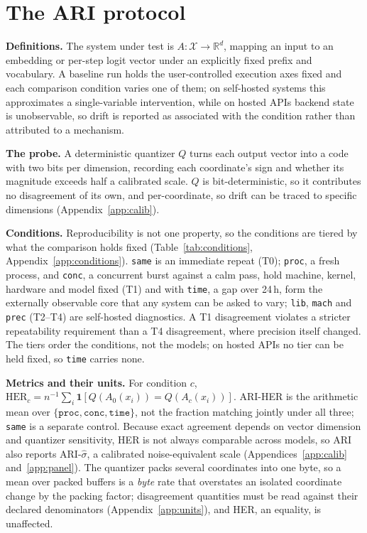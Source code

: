 \documentclass{article}
\begin{document}
\vspace{-4pt}\section{The ARI protocol}\label{sec2}\vspace{-2pt}

\textbf{Definitions.} The system under test is $A:\mathcal{X}\to\mathbb{R}^{d}$, mapping an input to an embedding or per-step logit vector under an explicitly fixed prefix and vocabulary. A baseline run holds the user-controlled execution axes fixed and each comparison condition varies one of them; on self-hosted systems this approximates a single-variable intervention, while on hosted APIs backend state is unobservable, so drift is reported as associated with the condition rather than attributed to a mechanism.

\textbf{The probe.} A deterministic quantizer $Q$ turns each output vector into a code with two bits per dimension, recording each coordinate's sign and whether its magnitude exceeds half a calibrated scale. $Q$ is bit-deterministic, so it contributes no disagreement of its own, and per-coordinate, so drift can be traced to specific dimensions (Appendix~\ref{app:calib}).

\textbf{Conditions.} Reproducibility is not one property, so the conditions are tiered by what the comparison holds fixed (Table~\ref{tab:conditions}, Appendix~\ref{app:conditions}). \texttt{same} is an immediate repeat (T0); \texttt{proc}, a fresh process, and \texttt{conc}, a concurrent burst against a calm pass, hold machine, kernel, hardware and model fixed (T1) and with \texttt{time}, a gap over 24\,h, form the externally observable core that any system can be asked to vary; \texttt{lib}, \texttt{mach} and \texttt{prec} (T2--T4) are self-hosted diagnostics. A T1 disagreement violates a stricter repeatability requirement than a T4 disagreement, where precision itself changed. The tiers order the conditions, not the models; on hosted APIs no tier can be held fixed, so \texttt{time} carries none.

\textbf{Metrics and their units.} For condition $c$, $\mathrm{HER}_c=n^{-1}\sum_i\mathbf 1[Q(A_0(x_i))=Q(A_c(x_i))]$. ARI-HER is the arithmetic mean over $\{\texttt{proc},\texttt{conc},\texttt{time}\}$, not the fraction matching jointly under all three; \texttt{same} is a separate control. Because exact agreement depends on vector dimension and quantizer sensitivity, HER is not always comparable across models, so ARI also reports ARI-$\hat\sigma$, a calibrated noise-equivalent scale (Appendices~\ref{app:calib} and~\ref{app:panel}). The quantizer packs several coordinates into one byte, so a mean over packed buffers is a \emph{byte} rate that overstates an isolated coordinate change by the packing factor; disagreement quantities must be read against their declared denominators (Appendix~\ref{app:units}), and HER, an equality, is unaffected.
\end{document}
